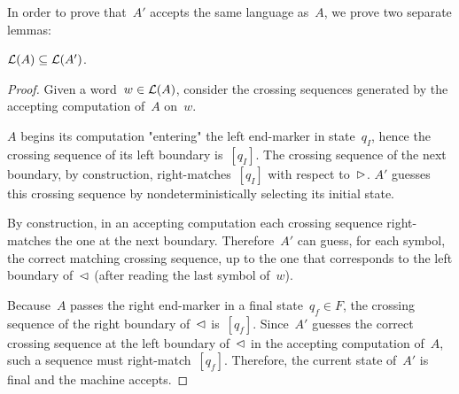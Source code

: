 In order to prove that~$A'$ accepts the same language as~$A$, we prove two separate lemmas:
\begin{lemm}\label{lem:2DFAto1NFA-1}
	$\mathcal L(A)\subseteq\mathcal L(A')$.
\end{lemm}
\begin{proof}
	Given a word~$w\in\mathcal L(A)$, consider the crossing sequences generated by the accepting computation of~$A$ on~$w$.

	$A$ begins its computation "entering" the left end-marker in state~$q_I$, hence the crossing sequence of its left boundary is~$[q_I]$.
	The crossing sequence of the next boundary, by construction, right-matches~$[q_I]$ with respect to~$\rhd$.
	$A'$ guesses this crossing sequence by nondeterministically selecting its initial state.

	By construction, in an accepting computation each crossing sequence right-matches the one at the next boundary.
	Therefore~$A'$ can guess, for each symbol, the correct matching crossing sequence, up to the one that corresponds to the left boundary of~$\lhd$ (after reading the last symbol of~$w$).

	Because~$A$ passes the right end-marker in a final state~$q_f\in F$, the crossing sequence of the right boundary of~$\lhd$ is~$[q_f]$.
	Since~$A'$ guesses the correct crossing sequence at the left boundary of~$\lhd$ in the accepting computation of~$A$, such a sequence must right-match~$[q_f]$.
	Therefore, the current state of~$A'$ is final and the machine accepts.
\end{proof}


